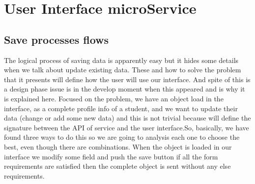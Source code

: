 \section{User Interface microService}




\subsection{Save processes flows}

The logical process of saving data is apparently easy but it hides some details
when we talk about update existing data. These and how to solve the problem that
it presents will define how the user will use our interface. And spite of this is
a design phase issue is in the develop moment when this appeared and is why it
is explained here.
\linebreak
\linebreak
\noindent Focused on the problem, we have an object load in the interface, as a complete
profile info of a student, and we want to update their data (change or add some
new data) and this is not trivial because will define the signature between the
API of service and the user interface.So, basically, we have found three ways to do this so we are going to analysis
each one to choose the best, even though there are combinations.
When the object is loaded in our interface we modify some field and push the save
button if all the form requirements are satisfied then the complete object is sent
without any else requirements.

